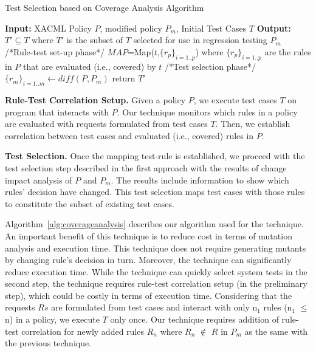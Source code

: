 \begin{algorithmic}
\begin{algorithm}[t]
\caption{\label{alg:coverageanalysis}Test Selection based on Coverage Analysis Algorithm}
\STATE \textbf{Input:} XACML Policy $P$, modified policy $P_{m}$, Initial Test Cases $T$
\STATE \textbf{Output:} $T' \subseteq T$ where $T'$ is the subset of $T$ selected for use in regression testing $P_{m}$
\STATE /*Rule-test set-up phase*/
\STATE $MAP$=Map($t$,$\{r_{p}\}_{i=1..p}$) where $\{r_{p}\}_{i=1..p}$ are the rules in $P$ that are evaluated (i.e., covered) by $t$
\ENDFOR
\STATE /*Test selection phase*/
\STATE $\{r_{m}\}_{i=1..m} \leftarrow diff(P,P_{m})$
\ENDFOR
\STATE return $T'$
\end{algorithm}
\end{algorithmic}

\textbf{Rule-Test Correlation Setup.} Given a policy $P$, we execute test cases $T$ on program that interacts with $P$. Our technique monitors which rules in a policy are evaluated with
requests formulated from test cases $T$. Then, we establish correlation between test cases and evaluated (i.e., covered) rules in $P$. 

\textbf{Test Selection.}
Once the mapping test-rule is established, we proceed with the test selection step described in the first approach with
the results of change impact analysis of $P$ and $P_m$. The results include information to show which rules' decision have changed.
This test selection maps test cases with those rules to constitute the subset of existing test cases.

Algorithm~\ref{alg:coverageanalysis} describes our algorithm used for the technique.
An important benefit of this technique is to reduce cost in terms of mutation analysis and execution time. This technique does not 
require generating mutants by changing rule's decision in turn. Moreover, the technique can significantly reduce execution time.
While the technique can quickly select system tests in the second step, the technique requires rule-test correlation setup (in the preliminary step), 
which could be costly in terms of execution time. Considering that the requests $Rs$ are formulated from test cases and interact with only n$_1$ rules (n$_1$ $\leq$ n) in a policy, 
we execute $T$ only once. Our technique requires addition of rule-test correlation for newly added rules $R_n$ where $R_n$ $\notin$ $R$ in $P_m$ as the same with the previous technique.


